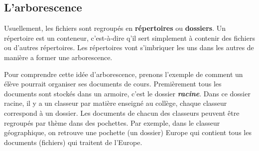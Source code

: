 \subsection{L'arborescence}
Usuellement, les fichiers sont regroupés en \textbf{répertoires} ou \textbf{dossiers}. Un répertoire est un conteneur, c'est-à-dire q'il sert simplement à contenir des fichiers ou d'autres répertoires. Les répertoires vont s'imbriquer les uns dans les autres de manière a former une arborescence.

Pour comprendre cette idée d'arborescence, prenons l'exemple de comment un élève pourrait organiser ses documents de cours. Premièrement tous les documents sont stockés dans un armoire, c'est le dossier \textit{\textbf{racine}}. Dans ce dossier racine, il y a un classeur par matière enseigné au collège, chaque classeur correspond à un dossier. Les documents de chacun des classeurs peuvent être regroupés par thème dans des pochettes. Par exemple, dans le classeur géographique, on retrouve une pochette (un dossier) Europe qui contient tous les documents (fichiers) qui traitent de l'Europe.


